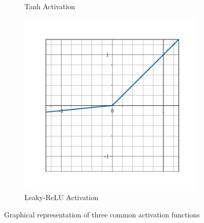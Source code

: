 \begin{figure}[htb]
\begin{subfigure}[b]{0.32\textwidth}
    \caption{Tanh Activation}
  \end{subfigure}
  \hfill
  \begin{subfigure}[b]{0.32\textwidth}
    \includegraphics[width=0.98\textwidth]{figures/main/ch2-background/relu.pdf}
    \caption{Leaky-ReLU Activation}
  \end{subfigure}
  \caption{Graphical representation of three common activation functions}
  \label{figure:ch2-activation_functions}
\end{figure}


